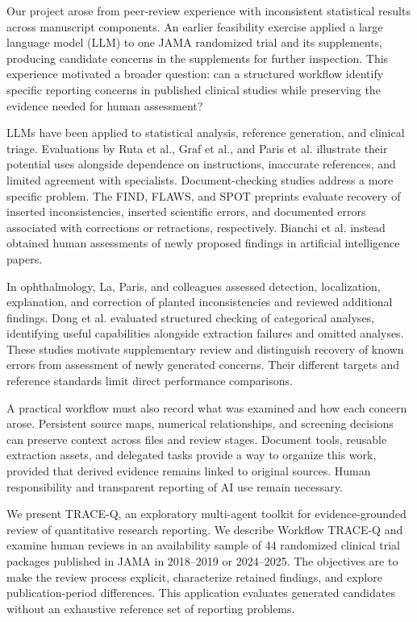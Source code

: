 \documentclass[12pt,a4paper]{article}
\begin{document}
Our project arose from peer-review experience with inconsistent statistical results across manuscript components. An earlier feasibility exercise applied a large language model (LLM) to one JAMA randomized trial and its supplements, producing candidate concerns in the supplements for further inspection. This experience motivated a broader question: can a structured workflow identify specific reporting concerns in published clinical studies while preserving the evidence needed for human assessment?

LLMs have been applied to statistical analysis, reference generation, and clinical triage. Evaluations by Ruta et al., Graf et al., and Paris et al. illustrate their potential uses alongside dependence on instructions, inaccurate references, and limited agreement with specialists.\cite{ruta2025statistics,graf2024referencing,paris2026triage} Document-checking studies address a more specific problem. The FIND, FLAWS, and SPOT preprints evaluate recovery of inserted inconsistencies, inserted scientific errors, and documented errors associated with corrections or retractions, respectively.\cite{lovering2025find,xi2025flaws,son2025spot} Bianchi et al. instead obtained human assessments of newly proposed findings in artificial intelligence papers.\cite{bianchi2025errors}

In ophthalmology, La, Paris, and colleagues assessed detection, localization, explanation, and correction of planted inconsistencies and reviewed additional findings.\cite{la2026consistency} Dong et al. evaluated structured checking of categorical analyses, identifying useful capabilities alongside extraction failures and omitted analyses.\cite{dong2026statistical} These studies motivate supplementary review and distinguish recovery of known errors from assessment of newly generated concerns. Their different targets and reference standards limit direct performance comparisons.

A practical workflow must also record what was examined and how each concern arose. Persistent source maps, numerical relationships, and screening decisions can preserve context across files and review stages. Document tools, reusable extraction assets, and delegated tasks provide a way to organize this work, provided that derived evidence remains linked to original sources. Human responsibility and transparent reporting of AI use remain necessary.\cite{flanagin2026guidance}

We present TRACE-Q, an exploratory multi-agent toolkit for evidence-grounded review of quantitative research reporting. We describe Workflow TRACE-Q and examine human reviews in an availability sample of 44 randomized clinical trial packages published in JAMA in 2018--2019 or 2024--2025. The objectives are to make the review process explicit, characterize retained findings, and explore publication-period differences. This application evaluates generated candidates without an exhaustive reference set of reporting problems.
\end{document}
